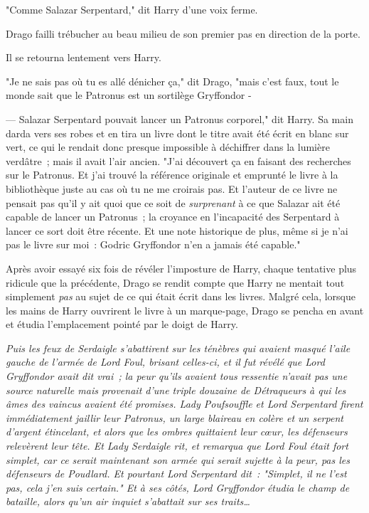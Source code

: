 "Comme Salazar Serpentard," dit Harry d'une voix ferme.

Drago failli trébucher au beau milieu de son premier pas en direction de la porte.

Il se retourna lentement vers Harry.

"Je ne sais pas où tu es allé dénicher ça," dit Drago, "mais c'est faux, tout le monde sait que le Patronus est un sortilège Gryffondor -

--- Salazar Serpentard pouvait lancer un Patronus corporel," dit Harry. Sa main darda vers ses robes et en tira un livre dont le titre avait été écrit en blanc sur vert, ce qui le rendait donc presque impossible à déchiffrer dans la lumière verdâtre~; mais il avait l'air ancien. "J'ai découvert ça en faisant des recherches sur le Patronus. Et j'ai trouvé la référence originale et emprunté le livre à la bibliothèque juste au cas où tu ne me croirais pas. Et l'auteur de ce livre ne pensait pas qu'il y ait quoi que ce soit de \emph{surprenant} à ce que Salazar ait été capable de lancer un Patronus~; la croyance en l'incapacité des Serpentard à lancer ce sort doit être récente. Et une note historique de plus, même si je n'ai pas le livre sur moi~: Godric Gryffondor n'en a jamais été capable."

Après avoir essayé six fois de révéler l'imposture de Harry, chaque tentative plus ridicule que la précédente, Drago se rendit compte que Harry ne mentait tout simplement \emph{pas} au sujet de ce qui était écrit dans les livres. Malgré cela, lorsque les mains de Harry ouvrirent le livre à un marque-page, Drago se pencha en avant et étudia l'emplacement pointé par le doigt de Harry.

\emph{Puis les feux de Serdaigle s'abattirent sur les ténèbres qui avaient masqué l'aile gauche de l'armée de Lord Foul, brisant celles-ci, et il fut révélé que Lord Gryffondor avait dit vrai~; la peur qu'ils avaient tous ressentie n'avait pas une source naturelle mais provenait d'une triple douzaine de Détraqueurs à qui les âmes des vaincus avaient été promises. Lady Poufsouffle et Lord Serpentard firent immédiatement jaillir leur Patronus, un large blaireau en colère et un serpent d'argent étincelant, et alors que les ombres quittaient leur cœur, les défenseurs relevèrent leur tête. Et Lady Serdaigle rit, et remarqua que Lord Foul était fort simplet, car ce serait maintenant son armée qui serait sujette à la peur, pas les défenseurs de Poudlard. Et pourtant Lord Serpentard dit~: "Simplet, il ne l'est pas, cela j'en suis certain." Et à ses côtés, Lord Gryffondor étudia le champ de bataille, alors qu'un air inquiet s'abattait sur ses traits…}

